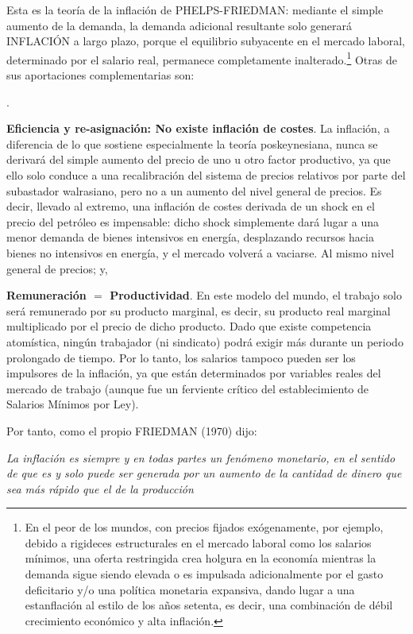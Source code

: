 \documentclass[10pt,a4paper]{article}
\newcounter{numitem}
\newenvironment{lnum}
      {\begin{list}{\arabic{numitem}.}{%
          \usecounter{numitem}%
          \setlength{\leftmargin}{1cm}%
          \setlength{\parskip}{3pt}%
          \setlength{\itemsep}{0pt}%
          \setlength{\parsep}{0pt}%
      }}
      {\end{list}}
\begin{document}
Esta es la teoría de la inflación de PHELPS-FRIEDMAN: mediante el simple aumento de la demanda, la demanda adicional resultante solo generará INFLACIÓN a largo plazo, porque el equilibrio subyacente en el mercado laboral, determinado por el salario real, permanece completamente inalterado.\footnote{%
    En el peor de los mundos, con precios fijados exógenamente, por ejemplo, debido a rigideces estructurales en el mercado laboral como los salarios mínimos, una oferta restringida crea holgura en la economía mientras la demanda sigue siendo elevada o es impulsada adicionalmente por el gasto deficitario y/o una política monetaria expansiva, dando lugar a una estanflación al estilo de los años setenta, es decir, una combinación de débil crecimiento económico y alta inflación.
} Otras de sus aportaciones complementarias son:
\begin{lnum}
    \item \textbf{Eficiencia y re-asignación: No existe inflación de costes}. La inflación, a diferencia de lo que sostiene especialmente la teoría poskeynesiana, nunca se derivará del simple aumento del precio de uno u otro factor productivo, ya que ello solo conduce a una recalibración del sistema de precios relativos por parte del subastador walrasiano, pero no a un aumento del nivel general de precios. Es decir, llevado al extremo, una inflación de costes derivada de un shock en el precio del petróleo es impensable: dicho shock simplemente dará lugar a una menor demanda de bienes intensivos en energía, desplazando recursos hacia bienes no intensivos en energía, y el mercado volverá a vaciarse. Al mismo nivel general de precios; y,
    \item \textbf{Remuneración $=$ Productividad}. En este modelo del mundo, el trabajo solo será remunerado por su producto marginal, es decir, su producto real marginal multiplicado por el precio de dicho producto. Dado que existe competencia atomística, ningún trabajador (ni sindicato) podrá exigir más durante un periodo prolongado de tiempo. Por lo tanto, los salarios tampoco pueden ser los impulsores de la inflación, ya que están determinados por variables reales del mercado de trabajo (aunque fue un ferviente crítico del establecimiento de Salarios Mínimos por Ley).
\end{lnum}

Por tanto, como el propio FRIEDMAN (1970) dijo:

\textit{La inflación es siempre y en todas partes un fenómeno monetario, en el sentido de que es y solo puede ser generada por un aumento de la cantidad de dinero que sea más rápido que el de la producción}
\end{document}
